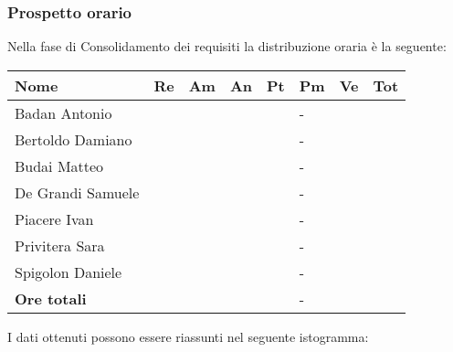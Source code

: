 \subsubsection{Prospetto orario}
Nella fase di Consolidamento dei requisiti la distribuzione oraria è la seguente:
\begin{center}
	\begin{longtable}{|p{}|p{}|p{}|p{}|p{}|p{}|p{}|p{}|}
		\hline
		\rowcolor{lighter-grayer}
		\centering\textbf{Nome} & \centering\textbf{Re} & \centering\textbf{Am} & \centering\textbf{An} &  \centering\textbf{Pt}&  \centering\textbf{Pm}&  \centering\textbf{Ve} & \textbf{Tot}\\
		\hline
		\endfirsthead
		
		\hline
		\centering Badan Antonio & \centering & \centering & \centering & \centering & \centering - & \centering &\\
		\hline
		\centering Bertoldo Damiano & \centering & \centering & \centering & \centering & \centering - & \centering &\\
		\hline
		\centering Budai Matteo & \centering & \centering & \centering & \centering & \centering - & \centering &\\
		\hline
		\centering De Grandi Samuele & \centering & \centering & \centering & \centering & \centering - & \centering &\\
		\hline
		\centering Piacere Ivan & \centering & \centering & \centering & \centering & \centering - & \centering &\\
		\hline
		\centering Privitera Sara & \centering & \centering & \centering & \centering & \centering - & \centering &\\
		\hline
		\centering Spigolon Daniele & \centering & \centering & \centering & \centering & \centering - & \centering &\\
		\hline
		\centering\textbf{Ore totali}  & \centering & \centering & \centering & \centering & \centering - & \centering &\\
		\hline
		
	\end{longtable}
\end{center}
I dati ottenuti possono essere riassunti nel seguente istogramma:

